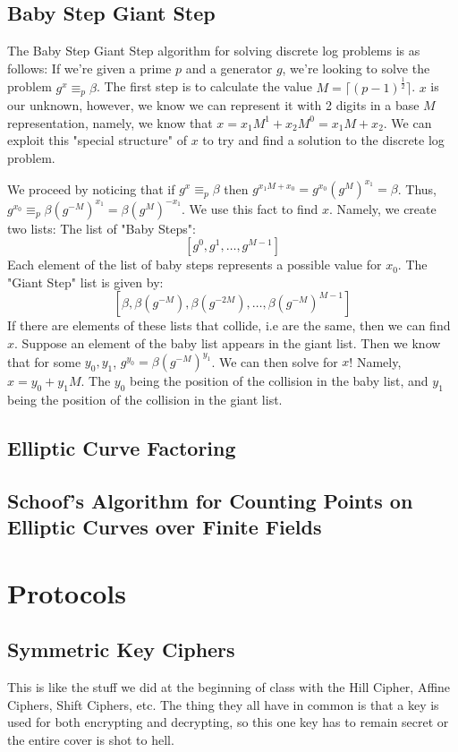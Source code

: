 \documentclass[12pt,a4paper]{article}
\begin{document}
\subsection{Baby Step Giant Step}
The Baby Step Giant Step algorithm for solving discrete log problems is as follows: 
If we're given a prime $p$ and a generator $g$, we're looking to solve the problem $g^{x} \equiv_{p} \beta$. The first step is to calculate the value $M = \lceil(p-1)^{\frac{1}{2}}\rceil$. $x$ is our unknown, however, we know we can represent it with 2 digits in a base $M$ representation, namely, we know that $x = x_{1}M^{1} + x_{2}M^{0} = x_{1}M + x_{2}$. We can exploit this "special structure" of $x$ to try and find a solution to the discrete log problem. 

We proceed by noticing that if $g^{x} \equiv_{p} \beta$ then $g^{x_{1}M + x_{0}} = g^{x_{0}}(g^{M})^{x_{1}} = \beta$. Thus, $g^{x_{0}} \equiv_{p} \beta(g^{-M})^{x_{1}} = \beta(g^{M})^{-x_{1}}$. We use this fact to find $x$. Namely, we create two lists:
The list of "Baby Steps":
\[
	\left[g^{0}, g^{1}, \ldots, g^{M-1}\right]
\] 
Each element of the list of baby steps represents a possible value for $x_{0}$. The "Giant Step" list is given by:
\[
	\left[\beta, \beta(g^{-M}), \beta(g^{-2M}), \ldots, \beta(g^{-M})^{M-1}\right]
\]
If there are elements of these lists that collide, i.e are the same, then we can find $x$. Suppose an element of the baby list appears in the giant list. Then we know that for some $y_{0}, y_{1}$, $g^{y_{0}} = \beta(g^{-M})^{y_{1}}$. We can then solve for $x$! Namely, $x = y_{0} + y_{1}M$. The $y_{0}$ being the position of the collision in the baby list, and $y_{1}$ being the position of the collision in the giant list. 
\subsection{Elliptic Curve Factoring}
\subsection{Schoof's Algorithm for Counting Points on Elliptic Curves over Finite Fields}

\section{Protocols}
\subsection{Symmetric Key Ciphers}
This is like the stuff we did at the beginning of class with the Hill Cipher, Affine Ciphers, Shift Ciphers, etc. The thing they all have in common is that a key is used for both encrypting and decrypting, so this one key has to remain secret or the entire cover is shot to hell. 
\end{document}
